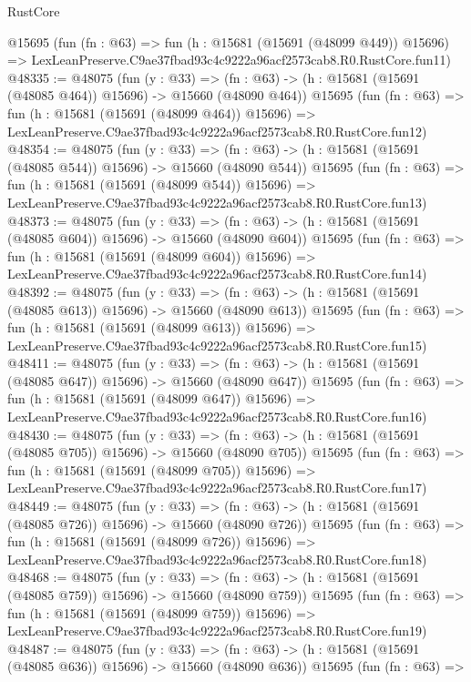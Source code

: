 \begin{lexlean}{RustCore}
\begin{coremodule}
    @15695
    (fun (fn : @63) =>
    fun (h : @15681 (@15691 (@48099 @449)) @15696) =>
    LexLeanPreserve.C9ae37fbad93c4c9222a96acf2573cab8.R0.RustCore.fun11)
@48335 := @48075
    (fun (y : @33) =>
    (fn : @63) -> (h : @15681 (@15691 (@48085 @464)) @15696) -> @15660 (@48090 @464))
    @15695
    (fun (fn : @63) =>
    fun (h : @15681 (@15691 (@48099 @464)) @15696) =>
    LexLeanPreserve.C9ae37fbad93c4c9222a96acf2573cab8.R0.RustCore.fun12)
@48354 := @48075
    (fun (y : @33) =>
    (fn : @63) -> (h : @15681 (@15691 (@48085 @544)) @15696) -> @15660 (@48090 @544))
    @15695
    (fun (fn : @63) =>
    fun (h : @15681 (@15691 (@48099 @544)) @15696) =>
    LexLeanPreserve.C9ae37fbad93c4c9222a96acf2573cab8.R0.RustCore.fun13)
@48373 := @48075
    (fun (y : @33) =>
    (fn : @63) -> (h : @15681 (@15691 (@48085 @604)) @15696) -> @15660 (@48090 @604))
    @15695
    (fun (fn : @63) =>
    fun (h : @15681 (@15691 (@48099 @604)) @15696) =>
    LexLeanPreserve.C9ae37fbad93c4c9222a96acf2573cab8.R0.RustCore.fun14)
@48392 := @48075
    (fun (y : @33) =>
    (fn : @63) -> (h : @15681 (@15691 (@48085 @613)) @15696) -> @15660 (@48090 @613))
    @15695
    (fun (fn : @63) =>
    fun (h : @15681 (@15691 (@48099 @613)) @15696) =>
    LexLeanPreserve.C9ae37fbad93c4c9222a96acf2573cab8.R0.RustCore.fun15)
@48411 := @48075
    (fun (y : @33) =>
    (fn : @63) -> (h : @15681 (@15691 (@48085 @647)) @15696) -> @15660 (@48090 @647))
    @15695
    (fun (fn : @63) =>
    fun (h : @15681 (@15691 (@48099 @647)) @15696) =>
    LexLeanPreserve.C9ae37fbad93c4c9222a96acf2573cab8.R0.RustCore.fun16)
@48430 := @48075
    (fun (y : @33) =>
    (fn : @63) -> (h : @15681 (@15691 (@48085 @705)) @15696) -> @15660 (@48090 @705))
    @15695
    (fun (fn : @63) =>
    fun (h : @15681 (@15691 (@48099 @705)) @15696) =>
    LexLeanPreserve.C9ae37fbad93c4c9222a96acf2573cab8.R0.RustCore.fun17)
@48449 := @48075
    (fun (y : @33) =>
    (fn : @63) -> (h : @15681 (@15691 (@48085 @726)) @15696) -> @15660 (@48090 @726))
    @15695
    (fun (fn : @63) =>
    fun (h : @15681 (@15691 (@48099 @726)) @15696) =>
    LexLeanPreserve.C9ae37fbad93c4c9222a96acf2573cab8.R0.RustCore.fun18)
@48468 := @48075
    (fun (y : @33) =>
    (fn : @63) -> (h : @15681 (@15691 (@48085 @759)) @15696) -> @15660 (@48090 @759))
    @15695
    (fun (fn : @63) =>
    fun (h : @15681 (@15691 (@48099 @759)) @15696) =>
    LexLeanPreserve.C9ae37fbad93c4c9222a96acf2573cab8.R0.RustCore.fun19)
@48487 := @48075
    (fun (y : @33) =>
    (fn : @63) -> (h : @15681 (@15691 (@48085 @636)) @15696) -> @15660 (@48090 @636))
    @15695
    (fun (fn : @63) =>

\end{coremodule}
\end{lexlean}
